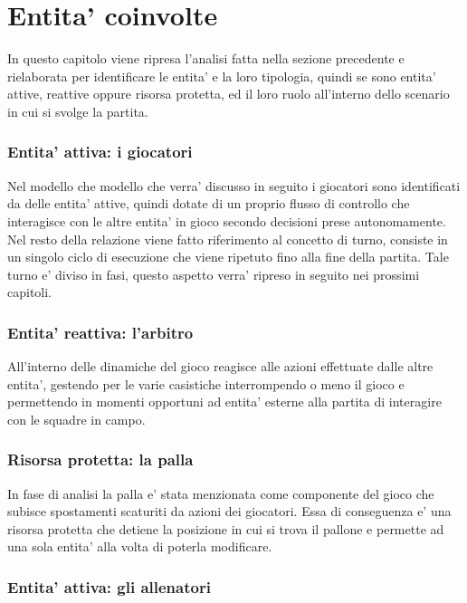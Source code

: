 \section*{Entita' coinvolte}

In questo capitolo viene ripresa l'analisi fatta nella sezione precedente e rielaborata per identificare le entita' e la loro tipologia, quindi se sono entita' attive, reattive oppure risorsa protetta, ed il loro ruolo all'interno dello scenario in cui si svolge la partita. 

\subsubsection{Entita' attiva: i giocatori}
\label{sec:entita_coinvolte_giocatori}

Nel modello che modello che verra' discusso in seguito i giocatori sono identificati da delle entita' attive, quindi dotate di un proprio flusso di controllo che interagisce con le altre entita' in gioco secondo decisioni prese autonomamente. Nel resto della relazione viene fatto riferimento al concetto di turno, consiste in un singolo ciclo di esecuzione che viene ripetuto fino alla fine della partita. Tale turno e' diviso in fasi, questo aspetto verra' ripreso in seguito nei prossimi capitoli.

\subsubsection{Entita' reattiva: l'arbitro}
\label{sec:entita_coinvolte_abitro}

All'interno delle dinamiche del gioco reagisce alle azioni effettuate dalle altre entita', gestendo per le varie casistiche interrompendo o meno il gioco e permettendo in momenti opportuni ad entita' esterne alla partita di interagire con le squadre in campo.

\subsubsection{Risorsa protetta: la palla}
\label{sec:entita_coinvolte_palla}

In fase di analisi la palla e' stata menzionata come componente del gioco che subisce spostamenti scaturiti da azioni dei giocatori. Essa di conseguenza e' una risorsa protetta che detiene la posizione in cui si trova il pallone e permette ad una sola entita' alla volta di poterla modificare.

\subsubsection{Entita' attiva: gli allenatori}
\label{sec:entita_coinvolte_allenatori}

